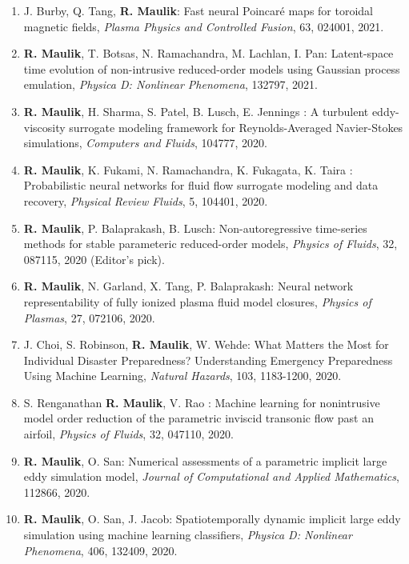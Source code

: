 \documentclass[letterpaper]{article}
\begin{document}
\begin{enumerate}
\item J. Burby, Q. Tang, \textbf{R. Maulik}: Fast neural Poincar\'{e} maps for toroidal magnetic fields, {\it Plasma Physics and Controlled Fusion}, 63, 024001, 2021.

\item \textbf{R. Maulik}, T. Botsas, N. Ramachandra, M. Lachlan, I. Pan: Latent-space time evolution of non-intrusive reduced-order models using Gaussian process emulation, {\it Physica D: Nonlinear Phenomena}, 132797, 2021. 

\item \textbf{R. Maulik}, H. Sharma, S. Patel, B. Lusch, E. Jennings : A turbulent eddy-viscosity surrogate modeling framework for Reynolds-Averaged Navier-Stokes simulations, {\it Computers and Fluids}, 104777, 2020. 

\item \textbf{R. Maulik}, K. Fukami, N. Ramachandra, K. Fukagata, K. Taira : Probabilistic neural networks for fluid flow surrogate modeling and data recovery, {\it Physical Review Fluids}, 5, 104401, 2020. 

\item \textbf{R. Maulik}, P. Balaprakash, B. Lusch: Non-autoregressive time-series methods for stable parameteric reduced-order models, {\it Physics of Fluids}, 32, 087115, 2020 (Editor's pick). 

\item \textbf{R. Maulik}, N. Garland, X. Tang, P. Balaprakash: Neural network representability of fully ionized plasma fluid model closures, {\it Physics of Plasmas}, 27, 072106, 2020.

\item J. Choi, S. Robinson, \textbf{R. Maulik}, W. Wehde: What Matters the Most for Individual Disaster Preparedness? Understanding Emergency Preparedness Using Machine Learning, {\it Natural Hazards}, 103, 1183-1200, 2020. 

\item S. Renganathan \textbf{R. Maulik}, V. Rao : Machine learning for nonintrusive model order reduction of the parametric inviscid transonic flow past an airfoil, {\it Physics of Fluids}, 32, 047110, 2020. 

\item \textbf{R. Maulik}, O. San: Numerical assessments of a parametric implicit large eddy simulation model, {\it Journal of Computational and Applied Mathematics}, 112866, 2020.

\item \textbf{R. Maulik}, O. San, J. Jacob: Spatiotemporally dynamic implicit large eddy simulation using machine learning classifiers, {\it Physica D: Nonlinear Phenomena}, 406, 132409, 2020. 


\end{enumerate}
\end{document}
